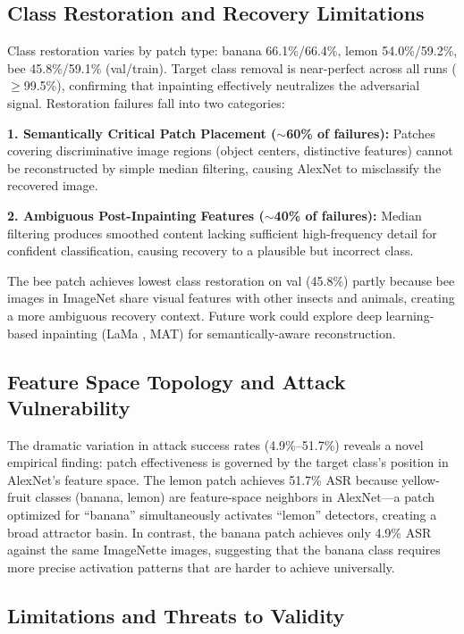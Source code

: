 \documentclass[conference]{IEEEtran}
\begin{document}
\subsection{Class Restoration and Recovery Limitations}

Class restoration varies by patch type: banana 66.1\%/66.4\%, lemon 54.0\%/59.2\%, bee 45.8\%/59.1\% (val/train). Target class removal is near-perfect across all runs ($\geq$99.5\%), confirming that inpainting effectively neutralizes the adversarial signal. Restoration failures fall into two categories:

\textbf{1. Semantically Critical Patch Placement ($\sim$60\% of failures):} Patches covering discriminative image regions (object centers, distinctive features) cannot be reconstructed by simple median filtering, causing AlexNet to misclassify the recovered image.

\textbf{2. Ambiguous Post-Inpainting Features ($\sim$40\% of failures):} Median filtering produces smoothed content lacking sufficient high-frequency detail for confident classification, causing recovery to a plausible but incorrect class.

The bee patch achieves lowest class restoration on val (45.8\%) partly because bee images in ImageNet share visual features with other insects and animals, creating a more ambiguous recovery context. Future work could explore deep learning-based inpainting (LaMa \cite{suvorov2022lama}, MAT) for semantically-aware reconstruction.

\subsection{Feature Space Topology and Attack Vulnerability}

The dramatic variation in attack success rates (4.9\%--51.7\%) reveals a novel empirical finding: patch effectiveness is governed by the target class's position in AlexNet's feature space. The lemon patch achieves 51.7\% ASR because yellow-fruit classes (banana, lemon) are feature-space neighbors in AlexNet---a patch optimized for ``banana'' simultaneously activates ``lemon'' detectors, creating a broad attractor basin. In contrast, the banana patch achieves only 4.9\% ASR against the same ImageNette images, suggesting that the banana class requires more precise activation patterns that are harder to achieve universally.

\subsection{Limitations and Threats to Validity}
\end{document}
